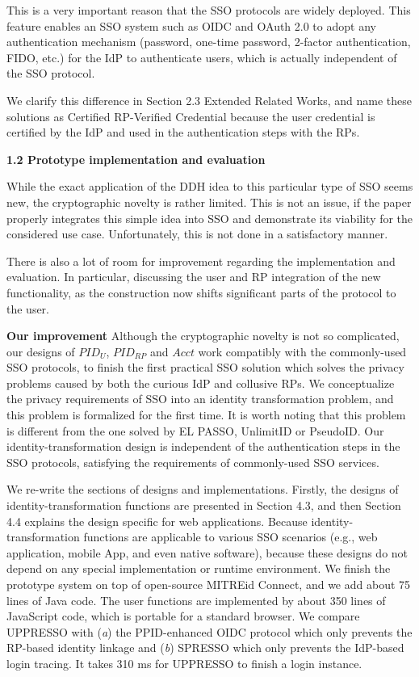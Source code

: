 \documentclass[letterpaper,onecolumn,10pt]{article}
\begin{document}
This is a very important reason that the SSO protocols are widely deployed.
This feature enables an SSO system such as OIDC and OAuth 2.0 to adopt any authentication mechanism
 (password, one-time password, 2-factor authentication, FIDO, etc.) for the IdP to authenticate users, which is actually independent of the SSO protocol.

We clarify this difference in Section 2.3 Extended Related Works,
    and name these solutions as Certified RP-Verified Credential
        because the user credential is certified by the IdP and used in the authentication steps with the RPs.


\vspace{1mm}\noindent\textbf{1.2 Prototype implementation and evaluation}

While the exact application of the DDH idea to this particular type of SSO seems new, the cryptographic novelty is rather limited.
This is not an issue, if the paper properly integrates this simple idea into SSO and demonstrate its viability for the considered use case.
Unfortunately, this is not done in a satisfactory manner.

There is also a lot of room for improvement regarding the implementation and evaluation.
In particular, discussing the user and RP integration of the new functionality, as the construction now shifts significant parts of the protocol to the user.


\vspace{1mm}\noindent\textbf{Our improvement}
Although the cryptographic novelty is not so complicated,
        our designs of $PID_U$, $PID_{RP}$ and $Acct$ work compatibly with the commonly-used SSO protocols,
            to finish the first practical SSO solution which solves the privacy problems caused by both the curious IdP and collusive RPs.
We conceptualize the privacy requirements of SSO into an identity transformation problem,
    and this problem is formalized for the first time.
It is worth noting that 
        this problem is different from the one solved by EL PASSO, UnlimitID or PseudoID.
Our identity-transformation design is independent of the authentication steps in the SSO protocols,
            satisfying the requirements of commonly-used SSO services.

We re-write the sections of designs and implementations.
Firstly,
    the designs of identity-transformation functions are presented in Section 4.3,
        and then Section 4.4 explains the design specific for web applications.
Because identity-transformation functions are applicable to various SSO scenarios
        (e.g., web application, mobile App, and even native software),
    because these designs do not depend on any special implementation or runtime environment.
We finish the prototype system on top of open-source MITREid Connect,
    and we add about 75 lines of Java code.
The user functions are implemented by about 350 lines of JavaScript code,
    which is portable for a standard browser.
We compare UPPRESSO with (\emph{a}) the PPID-enhanced OIDC protocol which only prevents the RP-based identity linkage
     and (\emph{b}) SPRESSO which only prevents the IdP-based login tracing.
It takes 310 ms for UPPRESSO to finish a login instance.
\end{document}
